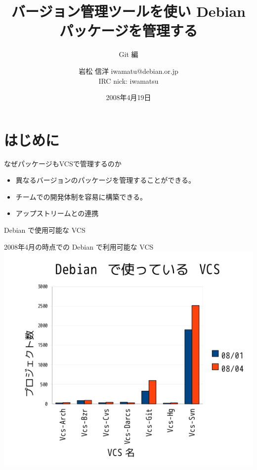 \documentclass[cjk,dvipdfmx,12pt]{beamer}
\title{バージョン管理ツールを使い Debian パッケージを管理する}
\subtitle{Git 編}
\author{岩松 信洋 iwamatu@debian.or.jp\\IRC nick: iwamatsu}
\date{2008年4月19日}
\begin{document}
\frame{\titlepage{}}


\section{はじめに}

\begin{frame}{なぜパッケージもVCSで管理するのか}
\begin{itemize}
  \item 異なるバージョンのパッケージを管理することができる。
  \item チームでの開発体制を容易に構築できる。
  \item アップストリームとの連携
\end{itemize}
\end{frame}

\begin{frame}{Debian で使用可能な VCS}
\begin{center}
2008年4月の時点での Debian で利用可能な VCS
\includegraphics[width=1.0\hsize]{image200804/debian-vcs-200804.png}
\end{center}
\end{frame}
\end{document}
